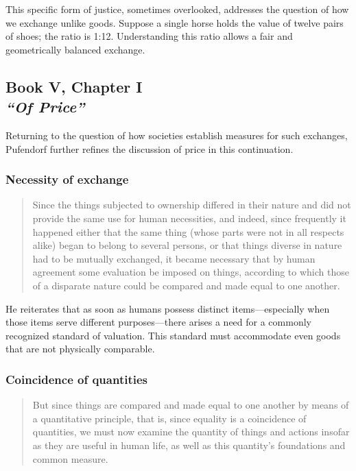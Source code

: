             This specific form of justice, sometimes overlooked, addresses the question of how we exchange unlike goods. Suppose a single horse holds the value of twelve pairs of shoes; the ratio is 1:12. Understanding this ratio allows a fair and geometrically balanced exchange.
    
    \subsection[Of Price cont'd]{Book V, Chapter I\\
                \textit{“Of Price”}}

        Returning to the question of how societies establish measures for such exchanges, Pufendorf further refines the discussion of price in this continuation.

        \subsubsection{Necessity of exchange}

            \begin{quote}
                Since the things subjected to ownership differed in their nature and did not provide the same use for human necessities, and indeed, since frequently it happened either that the same thing (whose parts were not in all respects alike) began to belong to several persons, or that things diverse in nature had to be mutually exchanged, it became necessary that by human agreement some evaluation be imposed on things, according to which those of a disparate nature could be compared and made equal to one another.
            \end{quote}

            He reiterates that as soon as humans possess distinct items—especially when those items serve different purposes—there arises a need for a commonly recognized standard of valuation. This standard must accommodate even goods that are not physically comparable.

        \subsubsection{Coincidence of quantities}

            \begin{quote}
                But since things are compared and made equal to one another by means of a quantitative principle, that is, since equality is a coincidence of quantities, we must now examine the quantity of things and actions insofar as they are useful in human life, as well as this quantity’s foundations and common measure.
            \end{quote}

